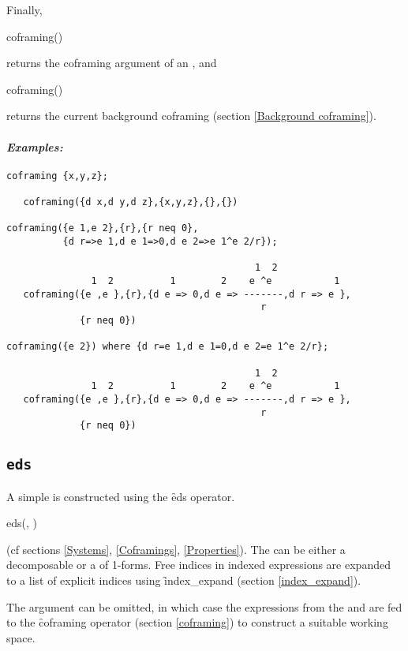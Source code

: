 Finally,
\begin{syntax}
	coframing()
\end{syntax}
returns the coframing argument of an , and
\begin{syntax}
	coframing()
\end{syntax}
returns the current background coframing (section \ref{Background
coframing}).

\paragraph{\it Examples:}
\begin{verbatim}
coframing {x,y,z};

   coframing({d x,d y,d z},{x,y,z},{},{})

coframing({e 1,e 2},{r},{r neq 0},
          {d r=>e 1,d e 1=>0,d e 2=>e 1^e 2/r});

                                            1  2
               1  2          1        2    e ^e           1
   coframing({e ,e },{r},{d e => 0,d e => -------,d r => e },
                                             r 
             {r neq 0})

coframing({e 2}) where {d r=e 1,d e 1=0,d e 2=e 1^e 2/r};

                                            1  2
               1  2          1        2    e ^e           1
   coframing({e ,e },{r},{d e => 0,d e => -------,d r => e },
                                             r 
             {r neq 0})
\end{verbatim}

\subsection{\tt eds}
\label{eds}

A simple  is constructed using the \f{eds} operator.
\begin{syntax}
	eds(,\ignorespaces
	)
\end{syntax}
(cf sections \ref{Systems}, \ref{Coframings}, \ref{Properties}). The
 can be either a decomposable  or a
 of 1-forms. Free indices in indexed expressions are expanded
to a list of explicit indices using \f{index\_expand} (section
\ref{index_expand}).

The  argument can be omitted, in which case the expressions
from the  and  are fed to the
\f{coframing} operator (section \ref{coframing}) to construct a suitable
working space.

